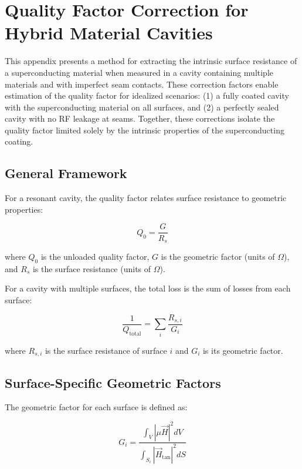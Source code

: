 \chapter{Quality Factor Correction for Hybrid Material Cavities} \label{app:Qcorrection}

This appendix presents a method for extracting the intrinsic surface resistance of a superconducting material when measured in a cavity containing multiple materials and with imperfect seam contacts. These correction factors enable estimation of the quality factor for idealized scenarios: (1) a fully coated cavity with the superconducting material on all surfaces, and (2) a perfectly sealed cavity with no RF leakage at seams. Together, these corrections isolate the quality factor limited solely by the intrinsic properties of the superconducting coating.

\section{General Framework}

For a resonant cavity, the quality factor relates surface resistance to geometric properties:

\begin{equation}
Q_0 = \frac{G}{R_s}
\label{eq:Q_basic}
\end{equation}

where $Q_0$ is the unloaded quality factor, $G$ is the geometric factor (units of $\Omega$), and $R_s$ is the surface resistance (units of $\Omega$).

For a cavity with multiple surfaces, the total loss is the sum of losses from each surface:

\begin{equation}
\frac{1}{Q_\text{total}} = \sum_{i} \frac{R_{s,i}}{G_i}
\label{eq:Q_multisurf}
\end{equation}

where $R_{s,i}$ is the surface resistance of surface $i$ and $G_i$ is its geometric factor.

\section{Surface-Specific Geometric Factors}

The geometric factor for each surface is defined as:

\begin{equation}
G_i = \frac{\int_V |\mu \vec{H}|^2 dV}{\int_{S_i} |\vec{H}_\text{tan}|^2 dS}
\label{eq:G_definition}
\end{equation}

